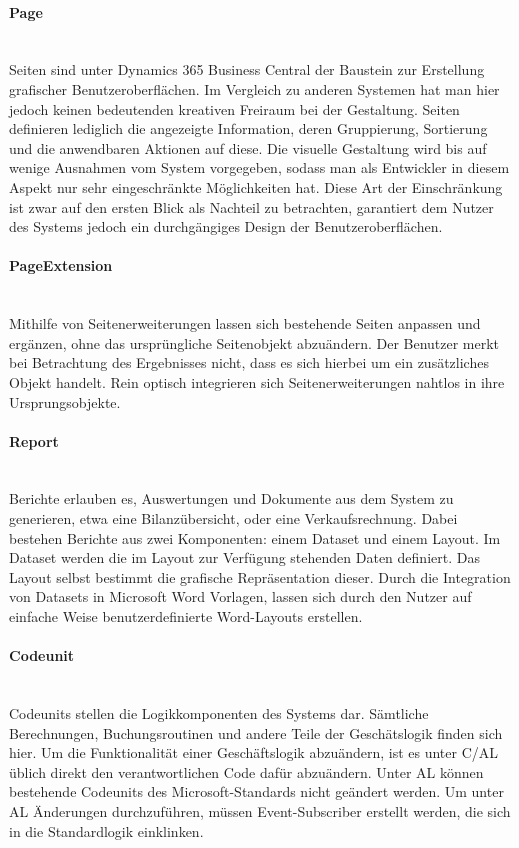 \paragraph{Page}\mbox{}\\
Seiten sind unter Dynamics 365 Business Central der Baustein zur Erstellung grafischer Benutzeroberflächen. Im Vergleich zu anderen Systemen hat man hier jedoch keinen bedeutenden kreativen Freiraum bei der Gestaltung. Seiten definieren lediglich die angezeigte Information, deren Gruppierung, Sortierung und die anwendbaren Aktionen auf diese. Die visuelle Gestaltung wird bis auf wenige Ausnahmen vom System vorgegeben, sodass man als Entwickler in diesem Aspekt nur sehr eingeschränkte Möglichkeiten hat. Diese Art der Einschränkung ist zwar auf den ersten Blick als Nachteil zu betrachten, garantiert dem Nutzer des Systems jedoch ein durchgängiges Design der Benutzeroberflächen.

\paragraph{PageExtension}\mbox{}\\
Mithilfe von Seitenerweiterungen lassen sich bestehende Seiten anpassen und ergänzen, ohne das ursprüngliche Seitenobjekt abzuändern. Der Benutzer merkt bei Betrachtung des Ergebnisses nicht, dass es sich hierbei um ein zusätzliches Objekt handelt. Rein optisch integrieren sich Seitenerweiterungen nahtlos in ihre Ursprungsobjekte.

\paragraph{Report}\mbox{}\\
Berichte erlauben es, Auswertungen und Dokumente aus dem System zu generieren, etwa eine Bilanzübersicht, oder eine Verkaufsrechnung. Dabei bestehen Berichte aus zwei Komponenten: einem Dataset und einem Layout. Im Dataset werden die im Layout zur Verfügung stehenden Daten definiert. Das Layout selbst bestimmt die grafische Repräsentation dieser. Durch die Integration von Datasets in Microsoft Word Vorlagen, lassen sich durch den Nutzer auf einfache Weise benutzerdefinierte Word-Layouts erstellen.

\paragraph{Codeunit}\mbox{}\\
Codeunits stellen die Logikkomponenten des Systems dar. Sämtliche Berechnungen, Buchungsroutinen und andere Teile der Geschätslogik finden sich hier. Um die Funktionalität einer Geschäftslogik abzuändern, ist es unter C/AL üblich direkt den verantwortlichen Code dafür abzuändern. Unter AL können bestehende Codeunits des Microsoft-Standards nicht geändert werden. Um unter AL Änderungen durchzuführen, müssen Event-Subscriber erstellt werden, die sich in die Standardlogik einklinken. 
\linebreak

